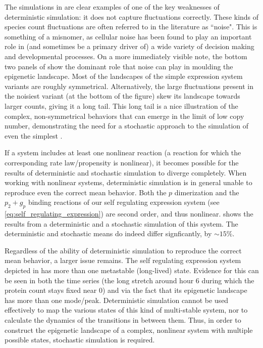 The simulations in  are clear examples of one of the key weaknesses of deterministic simulation: it does not capture fluctuations correctly. These kinds of species count fluctuations are often referred to in the literature as ``noise"\supercite{Elowitz:2002hb}. This is something of a misnomer, as cellular noise has been found to play an important role in (and sometimes be a primary driver of\supercite{Jaruszewicz:2013fe,Ahrends:2014bm}) a wide variety of decision making\supercite{Andrews:2007gu,Balazsi:2011bw} and developmental processes\supercite{Pujadas:2012dj}. On a more immediately visible note, the bottom two panels of  show the dominant role that noise can play in moulding the epigenetic landscape. Most of the landscapes of the simple expression system variants are roughly symmetrical. Alternatively, the large fluctuations present in the noisiest variant (at the bottom of the figure) skew its landscape towards larger counts, giving it a long tail. This long tail is a nice illustration of the complex, non-symmetrical behaviors that can emerge in the limit of low copy number, demonstrating the need for a stochastic approach to the simulation of even the simplest .

If a system includes at least one nonlinear reaction (\ie a reaction for which the corresponding rate law/propensity is nonlinear), it becomes possible for the results of deterministic and stochastic simulation to diverge completely. When working with nonlinear systems, deterministic simulation is in general unable to reproduce even the correct mean behavior\supercite{Hahl:2016ib}. Both the $p$ dimerization and the $p_{2} + g_{p}$ binding reactions of our self regulating expression system (see \eqref{eq:self_regulating_expression}) are second order, and thus nonlinear.  shows the results from a deterministic and a stochastic simulation of this system. The deterministic and stochastic means do indeed differ signficantly, by ${\sim} 15\%$.

Regardless of the ability of deterministic simulation to reproduce the correct mean behavior, a larger issue remains. The self regulating expression system depicted in  has more than one metastable (\ie long-lived) state. Evidence for this can be seen in both the time series (\eg the long stretch around hour 6 during which the protein count stays fixed near 0) and via the fact that its epigenetic landscape has more than one mode/peak. Deterministic simulation cannot be used effectively to map the various states of this kind of multi-stable system, nor to calculate the dynamics of the transitions in between them. Thus, in order to construct the epigenetic landscape of a complex, nonlinear system with multiple possible states, stochastic simulation is required.

